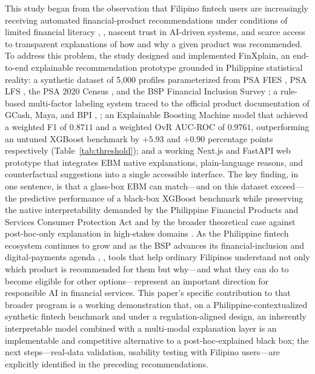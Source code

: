 \documentclass[journal]{./IEEE/IEEEtran}
\begin{document}
This study began from the observation that Filipino fintech users are increasingly receiving automated financial-product recommendations under conditions of limited financial literacy \cite{ref4}, \cite{ref43}, nascent trust in AI-driven systems, and scarce access to transparent explanations of how and why a given product was recommended. To address this problem, the study designed and implemented FinXplain, an end-to-end explainable recommendation prototype grounded in Philippine statistical reality: a synthetic dataset of 5{,}000 profiles parameterized from PSA FIES \cite{ref40}, PSA LFS \cite{ref41}, the PSA 2020 Census \cite{ref39}, and the BSP Financial Inclusion Survey \cite{ref35}; a rule-based multi-factor labeling system traced to the official product documentation of GCash, Maya, and BPI \cite{ref6}, \cite{ref37}; an Explainable Boosting Machine model that achieved a weighted F1 of $0.8711$ and a weighted OvR AUC-ROC of $0.9761$, outperforming an untuned XGBoost benchmark by $+5.93$ and $+0.90$ percentage points respectively (Table~\ref{tab:threshold}); and a working Next.js and FastAPI web prototype that integrates EBM native explanations, plain-language reasons, and counterfactual suggestions into a single accessible interface. The key finding, in one sentence, is that a glass-box EBM can match---and on this dataset exceed---the predictive performance of a black-box XGBoost benchmark while preserving the native interpretability demanded by the Philippine Financial Products and Services Consumer Protection Act \cite{ref44} and by the broader theoretical case against post-hoc-only explanation in high-stakes domains \cite{ref51}. As the Philippine fintech ecosystem continues to grow and as the BSP advances its financial-inclusion and digital-payments agenda \cite{ref35}, \cite{ref75}, tools that help ordinary Filipinos understand not only which product is recommended for them but why---and what they can do to become eligible for other options---represent an important direction for responsible AI in financial services. This paper's specific contribution to that broader program is a working demonstration that, on a Philippine-contextualized synthetic fintech benchmark and under a regulation-aligned design, an inherently interpretable model combined with a multi-modal explanation layer is an implementable and competitive alternative to a post-hoc-explained black box; the next steps---real-data validation, usability testing with Filipino users---are explicitly identified in the preceding recommendations.
\end{document}

